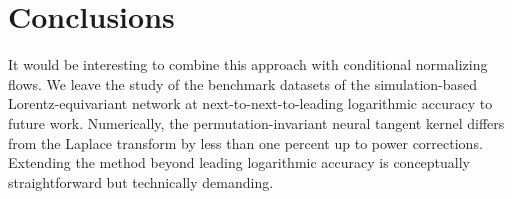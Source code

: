 \section{Conclusions}\label{sec:conclusions}

It would be interesting to combine this approach with conditional
normalizing flows. We leave the study of the benchmark datasets of the
simulation-based Lorentz-equivariant network at next-to-next-to-leading
logarithmic accuracy to future work. Numerically, the
permutation-invariant neural tangent kernel differs from the Laplace
transform by less than one percent up to power corrections. Extending
the method beyond leading logarithmic accuracy is conceptually
straightforward but technically demanding.

